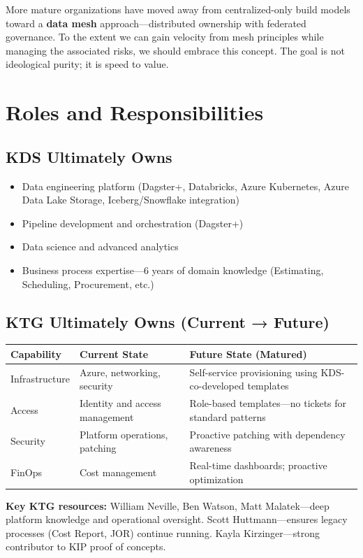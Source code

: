 \documentclass[12pt, a4paper]{article}
\begin{document}
More mature organizations have moved away from centralized-only build models toward a \textbf{data mesh} approach—distributed ownership with federated governance. To the extent we can gain velocity from mesh principles while managing the associated risks, we should embrace this concept. The goal is not ideological purity; it is speed to value.

\section{Roles and Responsibilities}

\subsection{KDS Ultimately Owns}
\begin{itemize}
    \item Data engineering platform (Dagster+, Databricks, Azure Kubernetes, Azure Data Lake Storage, Iceberg/Snowflake integration)
    \item Pipeline development and orchestration (Dagster+)
    \item Data science and advanced analytics
    \item Business process expertise—6 years of domain knowledge (Estimating, Scheduling, Procurement, etc.)
\end{itemize}

\subsection{KTG Ultimately Owns (Current → Future)}

\begin{tabular}{@{}p{3.5cm}p{4.5cm}p{6cm}@{}}
\toprule
\textbf{Capability} & \textbf{Current State} & \textbf{Future State (Matured)} \\
\midrule
Infrastructure & Azure, networking, security & Self-service provisioning using KDS-co-developed templates \\
Access & Identity and access management & Role-based templates—no tickets for standard patterns \\
Security & Platform operations, patching & Proactive patching with dependency awareness \\
FinOps & Cost management & Real-time dashboards; proactive optimization \\
\bottomrule
\end{tabular}

\vspace{0.5em}
\noindent \textbf{Key KTG resources:} William Neville, Ben Watson, Matt Malatek—deep platform knowledge and operational oversight. Scott Huttmann—ensures legacy processes (Cost Report, JOR) continue running. Kayla Kirzinger—strong contributor to KIP proof of concepts.
\end{document}
